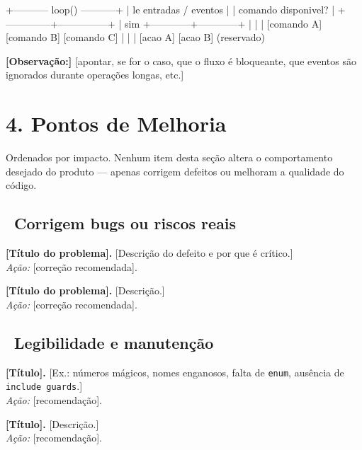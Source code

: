 \documentclass{anafw}
\begin{document}
\begin{codigo}
            +----------- loop() -----------+
            | le entradas / eventos        |
            | comando disponivel?          |
            +--------------+---------------+
                           | sim
              +------------+------------+
              |            |            |
          [comando A]  [comando B]  [comando C]
              |            |            |
          [acao A]     [acao B]     (reservado)
\end{codigo}

\noindent\textbf{[Observação:]} [apontar, se for o caso, que o fluxo é bloqueante,
que eventos são ignorados durante operações longas, etc.]


\section{4. Pontos de Melhoria}

Ordenados por impacto. Nenhum item desta seção altera o comportamento desejado do
produto --- apenas corrigem defeitos ou melhoram a qualidade do código.

\subsection{\nivelCritico\ Corrigem bugs ou riscos reais}

\begin{listaItens}
  \item \textbf{[Título do problema].} [Descrição do defeito e por que é crítico.]
        \\ \textit{Ação:} [correção recomendada].
  \item \textbf{[Título do problema].} [Descrição.]
        \\ \textit{Ação:} [correção recomendada].
\end{listaItens}

\subsection{\nivelEstrutural\ Legibilidade e manutenção}

\begin{listaItens}
  \item \textbf{[Título].} [Ex.: números mágicos, nomes enganosos, falta de \texttt{enum},
        ausência de \texttt{include guards}.] \\ \textit{Ação:} [recomendação].
  \item \textbf{[Título].} [Descrição.] \\ \textit{Ação:} [recomendação].
\end{listaItens}
\end{document}
